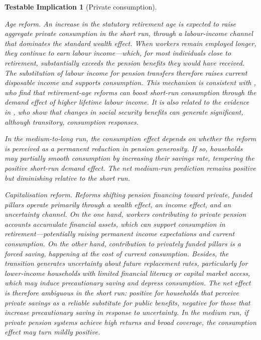 \documentclass[11pt,english,a4paper, twoside, authoryear]{article}
\newtheorem{testable}{Testable Implication}}
\begin{document}
\begin{testable}[Private consumption]\label{test:conso}


\textit{Age reform.} An increase in the statutory retirement age is expected to raise aggregate private consumption in the short run, through a labour-income channel that dominates the standard wealth effect. When workers remain employed longer, they continue to earn labour income---which, for most individuals close to retirement, substantially exceeds the pension benefits they would have received. The substitution of labour income for pension transfers therefore raises current disposable income and supports consumption. This mechanism is consistent with \citet{KaramMuirPereiraTuladhar2010}, who find that retirement-age reforms can boost short-run consumption through the demand effect of higher lifetime labour income. It is also related to the evidence in \citet{RomerRomer2016}, who show that changes in social security benefits can generate significant, although transitory, consumption responses.

In the medium-to-long run, the consumption effect depends on whether the reform is perceived as a permanent reduction in pension generosity. If so, households may partially smooth consumption by increasing their savings rate, tempering the positive short-run demand effect. The net medium-run prediction remains positive but diminishing relative to the short run.

\textit{Capitalisation reform.} Reforms shifting pension financing toward private, funded pillars operate primarily through a wealth effect, an income effect, and an uncertainty channel. On the one hand, workers contributing to private pension accounts accumulate financial assets, which can support consumption in retirement---potentially raising permanent income expectations and current consumption. On the other hand, contribution to privately funded pillars is a forced saving, happening at the cost of current consumption. Besides, the transition generates uncertainty about future replacement rates, particularly for lower-income households with limited financial literacy or capital market access, which may induce precautionary saving and depress consumption. The net effect is therefore ambiguous in the short run: positive for households that perceive private savings as a reliable substitute for public benefits, negative for those that increase precautionary saving in response to uncertainty. In the medium run, if private pension systems achieve high returns and broad coverage, the consumption effect may turn mildly positive.
\\

\end{testable}
\end{document}
